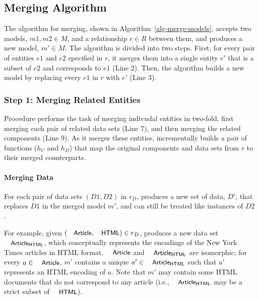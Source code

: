 \subsection{Merging Algorithm}

The algorithm for merging, shown in Algorithm~\ref{alg-merge-models},
accepts two models, $m1, m2 \in M$, and a relationship $r \in R$
between them, and produces a new model, $m' \in M$. The algorithm is
divided into two steps. First, for every pair of entities $e1$ and
$e2$ specified in $r$, it merges them into a single entity $e'$ that is a
subset of $e2$ and corresponds to $e1$ (Line 2). Then, the algorithm
builds a new model by replacing every $e1$ in $r$ with $e'$ (Line 3).


\subsubsection{Step 1: Merging Related Entities}

Procedure  performs the task of merging indivudal
entities in two-fold, first merging each pair of related data sets
(Line 7), and then merging the related components (Line 9). As it
merges these entities,  incrementally builds a
pair of functions ($h_{C}$ and $h_{D}$) that map the original
components and data sets from $r$ to their merged counterparts.


\paragraph{\textbf{Merging Data}} For each pair of data sets $(D1,
D2)$ in $r_{D}$,  produces a new set of data, $D'$,
that replaces $D1$ in the merged model $m'$, and can still be treated
like instances of $D2$. 

For example, given $(\txtcname{Article}, \txtcname{HTML}) \in r_{D}$,
 produces a new data set
$\txtcname{Article}_{\textsf{HTML}}$, which conceptually represents the
encodings of the New York Times articles in HTML
format. $\txtcname{Article}$ and $\txtcname{Article}_{\textsf{HTML}}$ are
isomorphic; for every $a \in \txtcname{Article}$, $m'$ contains a unique
$a' \in \txtcname{Article}_{\textsf{HTML}}$ such that $a'$ represents an
HTML encoding of $a$. Note that $m'$ may contain some HTML documents
that do not correspond to any article (i.e.,
$\txtcname{Article}_{\textsf{HTML}}$ may be a strict subset of $\txtcname{HTML}$).

